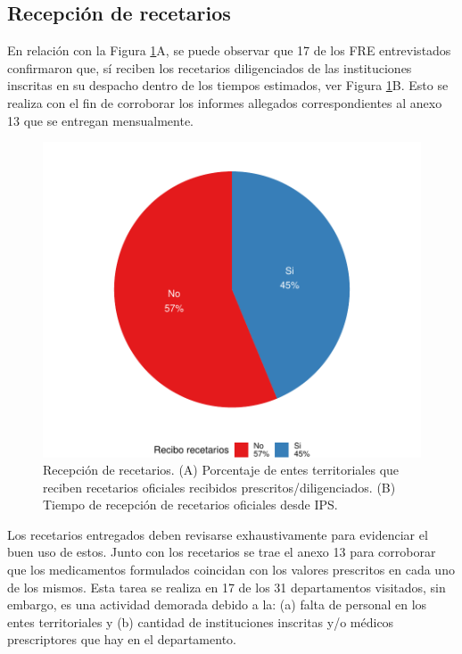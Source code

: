 \documentclass[
]{book}
\begin{document}

\hypertarget{recepciuxf3n-de-recetarios}{%
\subsection{Recepción de recetarios}\label{recepciuxf3n-de-recetarios}}

En relación con la Figura \ref{fig:ReciboRecetariosInstituciones}A, se puede observar que 17 de los FRE entrevistados confirmaron que, sí reciben los recetarios diligenciados de las instituciones inscritas en su despacho dentro de los tiempos estimados, ver Figura \ref{fig:ReciboRecetariosInstituciones}B. Esto se realiza con el fin de corroborar los informes allegados correspondientes al anexo 13 que se entregan mensualmente.

\begin{figure}

{\centering \includegraphics[width=1\linewidth]{InformeFinal_files/figure-latex/ReciboRecetariosInstituciones-1} 

}

\caption{Recepción de recetarios. (A) Porcentaje de entes territoriales que reciben recetarios oficiales recibidos prescritos/diligenciados. (B) Tiempo de recepción de recetarios oficiales desde IPS.}\label{fig:ReciboRecetariosInstituciones}
\end{figure}

Los recetarios entregados deben revisarse exhaustivamente para evidenciar el buen uso de estos. Junto con los recetarios se trae el anexo 13 para corroborar que los medicamentos formulados coincidan con los valores prescritos en cada uno de los mismos. Esta tarea se realiza en 17 de los 31 departamentos visitados, sin embargo, es una actividad demorada debido a la: (a) falta de personal en los entes territoriales y (b) cantidad de instituciones inscritas y/o médicos prescriptores que hay en el departamento.
\end{document}

